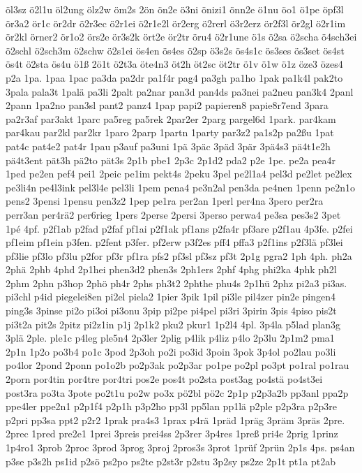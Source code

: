 {öl3sz
ö2l1u
öl2ung
ölz2w
öm2s
2ön
ön2e
ö3ni
önizi1
önn2e
ö1nu
öo1
ö1pe
öpf3l
ör3a2
ör1c
ör2dr
ö2r3ec
ö2r1ei
ö2r1e2l
ör2erg
ö2rerl
ö3r2erz
ör2f3l
ör2gl
ö2r1im
ör2kl
örner2
ör1o2
örs2e
ör3s2k
ört2e
ör2tr
öru4
ö2r1une
ö1s
ö2sa
ö2scha
ö4sch3ei
ö2schl
ö2sch3m
ö2schw
ö2s1ei
ös4en
ös4es
ö2sp
ö3s2s
ös4s1c
ös3ses
ös3set
ös4st
ös4t
ö2sta
ös4u
ö1ß
2ö1t
ö2t3a
öte4n3
öt2h
öt2sc
öt2tr
ö1v
ö1w
ö1z
öze3
özes4
p2a
1pa.
1paa
1pac
pa3da
pa2dr
pa1f4r
pag4
pa3gh
pa1ho
1pak
pa1k4l
pak2to
3pala
pala3t
1palä
pa3li
2palt
pa2nar
pan3d
pan4ds
pa3nei
pa2neu
pan3k4
2panl
2pann
1pa2no
pan3sl
pant2
panz4
1pap
papi2
papieren8
papie8r7end
3para
pa2r3af
par3akt
1parc
pa5reg
pa5rek
2par2er
2parg
pargel6d
1park.
par4kam
par4kau
par2kl
par2kr
1paro
2parp
1partn
1party
par3z2
pa1s2p
pa2ßu
1pat
pat4c
pat4e2
pat4r
1pau
p3auf
pa3uni
1pä
3päc
3päd
3pär
3pä4s3
pä4t1e2h
pä4t3ent
pät3h
pä2to
pät3s
2p1b
pbe1
2p3c
2p1d2
pda2
p2e
1pe.
pe2a
pea4r
1ped
pe2en
pef4
pei1
2peic
pe1im
pekt4s
2peku
3pel
pe2l1a4
pel3d
pe2let
pe2lex
pe3li4n
pe4l3ink
pel3l4e
pel3li
1pem
pena4
pe3n2al
pen3da
pe4nen
1penn
pe2n1o
pens2
3pensi
1pensu
pen3z2
1pep
pe1ra
per2an
1perl
per4na
3pero
per2ra
perr3an
per4rä2
per6rieg
1pers
2perse
2persi
3perso
perwa4
pe3sa
pes3s2
3pet
1pé
4pf.
p2f1ab
p2fad
p2faf
pf1ai
p2f1ak
pf1ans
p2fa4r
pf3are
p2f1au
4p3fe.
p2fei
pf1eim
pf1ein
p3fen.
p2fent
p3fer.
pf2erw
p3f2es
pff4
pffa3
p2f1ins
p2f3lä
pf3lei
pf3lie
pf3lo
pf3lu
p2for
pf3r
pf1ra
pfs2
pf3sl
pf3sz
pf3t
2p1g
pgra2
1ph
4ph.
ph2a
2phä
2phb
4phd
2p1hei
phen3d2
phen3s
2ph1ers
2phf
4phg
phi2ka
4phk
ph2l
2phm
2phn
p3hop
2phö
ph4r
2phs
ph3t2
2phthe
phu4s
2p1hü
2phz
pi2a3
pi3as.
pi3chl
p4id
piegelei8en
pi2el
piela2
1pier
3pik
1pil
pi3le
pil4zer
pin2e
pingen4
ping3s
3pinse
pi2o
pi3oi
pi3onu
3pip
pi2pe
pi4pel
pi3ri
3pirin
3pis
4piso
pis2t
pi3t2a
pit2s
2pitz
pi2z1in
p1j
2p1k2
pku2
pkur1
1p2l4
4pl.
3p4la
p5lad
plan3g
3plä
2ple.
ple1c
p4leg
ple5n4
2p3ler
2plig
p4lik
p4liz
p4lo
2p3lu
2p1m2
pma1
2p1n
1p2o
po3b4
po1c
3pod
2p3oh
po2i
po3id
3poin
3pok
3p4ol
po2lau
po3li
po4lor
2pond
2ponn
po1o2b
po2p3ak
po2p3ar
po1pe
po2pl
po3pt
po1ral
po1rau
2porn
por4tin
por4tre
por4tri
pos2e
pos4t
po2sta
post3ag
po4stä
po4st3ei
post3ra
po3ta
3pote
po2t1u
po2w
po3x
pö2bl
pö2c
2p1p
p2p3a2b
pp3anl
ppa2p
ppe4ler
ppe2n1
p2p1f4
p2p1h
p3p2ho
pp3l
pp5lan
pp1lä
p2ple
p2p3ra
p2p3re
p2pri
pp3sa
ppt2
p2r2
1prak
pra4s3
1prax
p4rä
1präd
1präg
3präm
3präs
2pre.
2prec
1pred
pre2e1
1prei
3preis
prei4ss
2p3rer
3p4res
1preß
pri4e
2prig
1prinz
1p4ro1
3prob
2proc
3prod
3prog
3proj
2pros3s
3prot
1prüf
2prün
2p1s
4ps.
ps4an
p3se
p3s2h
ps1id
p2sö
ps2po
ps2te
p2st3r
p2stu
3p2sy
ps2ze
2p1t
pt1a
pt2ab
}
